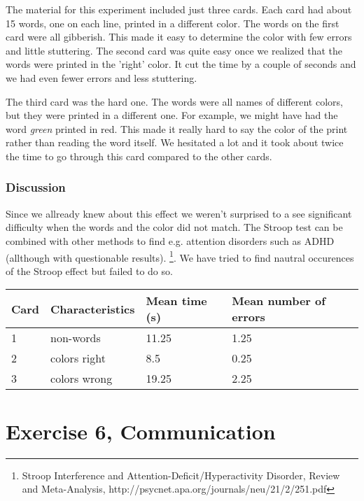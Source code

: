 \documentclass[10pt, a4paper]{article}
\begin{document}
The material for this experiment included just three cards.  Each card had about 15 words, one on each line, printed in a different color.  The words on the first card were all gibberish. This made it easy to determine the color with few errors and little stuttering. 
The second card was quite easy once we realized that the words were printed in the 'right' color. It cut the time by a couple of seconds and we had even fewer errors and less stuttering.

The third card was the hard one. The words were all names of different colors, but they were printed in a different one. For example, we might have had the word \emph{green} printed in red. This made it really hard to say the color of the print rather than reading the word itself.  We hesitated a lot and it took about twice the time to go through this card compared to the other cards. 

\subsubsection{Discussion}
Since we allready knew about this effect we weren't surprised to a see significant difficulty when the words and the color did not match. The Stroop test can be combined with other methods to find e.g. attention disorders such as ADHD (allthough with questionable results). \footnote{Stroop Interference and Attention-Deficit/Hyperactivity Disorder, Review and Meta-Analysis, http://psycnet.apa.org/journals/neu/21/2/251.pdf}. We have tried to find nautral occurences of the Stroop effect but failed to do so.\\[5mm]

\begin{tabular}{l l l l}
  Card & Characteristics & Mean time (s) & Mean number of errors \\
  \hline
  1 & non-words & 11.25 & 1.25 \\
  2 & colors right & 8.5 & 0.25 \\
  3 & colors wrong & 19.25 & 2.25 \\
\end{tabular}
\section{Exercise 6, Communication}
\end{document}
